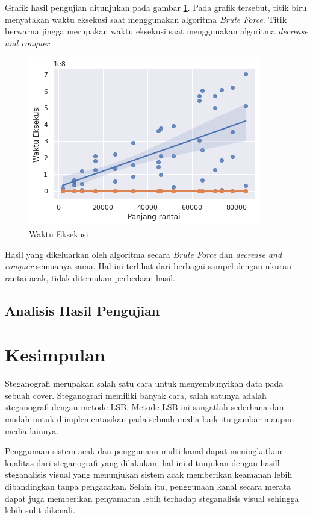 \documentclass[10pt,conference]{IEEEtran}
\theoremstyle{definition}
\begin{document}
\vspace{8px}

Grafik hasil pengujian ditunjukan pada gambar \ref{fig:grafik}. Pada grafik tersebut, titik biru menyatakan waktu eksekusi saat menggunakan algoritma \emph{Brute Force}. Titik berwarna jingga merupakan waktu eksekusi saat menggunakan algoritma  \emph{decrease and conquer}.

\begin{figure}[htbp]
    \centerline{\includegraphics[width=0.9\columnwidth]{grafik.png}}
    \caption{Waktu Eksekusi}
    \label{fig:grafik}
\end{figure}

Hasil yang dikeluarkan oleh algoritma secara \emph{Brute Force}  dan \emph{decrease and conquer} semuanya sama. Hal ini terlihat dari berbagai sampel dengan ukuran rantai acak, tidak ditemukan perbedaan hasil.


\subsection{Analisis Hasil Pengujian}


\section{Kesimpulan}
Steganografi merupakan salah satu cara untuk menyembunyikan data pada sebuah cover. Steganografi memiliki banyak cara, salah satunya adalah steganografi dengan metode LSB. Metode LSB ini sangatlah sederhana dan mudah
untuk diimplementasikan pada sebuah media baik itu gambar maupun media lainnya. 

Penggunaan sistem acak dan penggunaan multi kanal dapat meningkatkan kualitas dari steganografi yang dilakukan. hal ini ditunjukan dengan hasill steganalisis visual yang menunjukan sistem acak memberikan keamanan lebih
dibandingkan tanpa pengacakan. Selain itu, penggunaan kanal secara merata dapat juga memberikan penyamaran lebih terhadap steganalisis visual sehingga lebih sulit dikenali.
\end{document}
